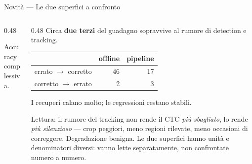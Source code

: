 \documentclass[aspectratio=169,10pt]{beamer}
\newcommand{\vbarn}[4]{%
  \filldraw[fill=#3, draw=black!45, line width=0.3pt]
    (#1-0.18,0) rectangle (#1+0.18,#2);
  \node[font=\tiny, above=0.5pt] at (#1,#2) {#4};}
\newcommand{\xlab}[2]{\node[font=\scriptsize, below=2pt, align=center] at (#1,0) {#2};}
\newcommand{\gline}[3]{%
  \draw[gray!30, line width=0.3pt] (#1,#3) -- (#2,#3);}
\newcommand{\lgd}[4]{%
  \fill[#3] (#1,#2) rectangle ++(0.28,0.20);
  \node[font=\tiny, right=1pt, anchor=west] at (#1+0.30,#2+0.10) {#4};}
\begin{document}
\begin{frame}{Novità --- Le due superfici a confronto}
  \begin{columns}[T]
    \begin{column}{0.48\textwidth}
      \centering
      \vspace{1.2em}

      \footnotesize
      Accuracy complessiva.
    \end{column}
    \begin{column}{0.48\textwidth}
      \small
      Circa \textbf{due terzi} del guadagno sopravvive al rumore di detection
      e tracking.
      \vspace{0.4em}
      \begin{center}\footnotesize
      \begin{tabular}{lrr}
        \toprule
        & offline & pipeline \\
        \midrule
        errato $\to$ corretto & 46 & 17 \\
        corretto $\to$ errato & 2 & 3 \\
        \bottomrule
      \end{tabular}
      \end{center}
      \vspace{0.4em}
      I recuperi calano molto; le regressioni restano stabili.
      \vspace{0.3em}

      Lettura: il rumore del tracking non rende il CTC \emph{più sbagliato},
      lo rende \emph{più silenzioso} --- crop peggiori, meno regioni rilevate,
      meno occasioni di correggere. Degradazione benigna.
      \vspace{0.4em}
      \footnotesize
      Le due superfici hanno unità e denominatori diversi: vanno lette
      separatamente, non confrontate numero a numero.
    \end{column}
  \end{columns}
\end{frame}
\end{document}

